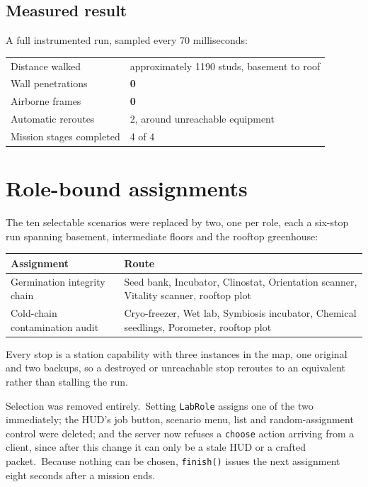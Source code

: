 \subsection{Measured result}
A full instrumented run, sampled every 70 milliseconds:

\begin{center}
\begin{tabular}{@{}ll@{}}
\toprule
Distance walked & approximately 1190 studs, basement to roof \\
Wall penetrations & \textbf{0} \\
Airborne frames & \textbf{0} \\
Automatic reroutes & 2, around unreachable equipment \\
Mission stages completed & 4 of 4 \\
\bottomrule
\end{tabular}
\end{center}

\section{Role-bound assignments}
The ten selectable scenarios were replaced by two, one per role, each a
six-stop run spanning basement, intermediate floors and the rooftop greenhouse:

\begin{center}
\begin{tabular}{@{}p{}p{}@{}}
\toprule
\textbf{Assignment} & \textbf{Route} \\
\midrule
Germination integrity chain & Seed bank, Incubator, Clinostat, Orientation scanner, Vitality scanner, rooftop plot \\
Cold-chain contamination audit & Cryo-freezer, Wet lab, Symbiosis incubator, Chemical seedlings, Porometer, rooftop plot \\
\bottomrule
\end{tabular}
\end{center}

Every stop is a station capability with three instances in the map, one original
and two backups, so a destroyed or unreachable stop reroutes to an equivalent
rather than stalling the run.\

Selection was removed entirely.\ Setting \texttt{LabRole} assigns one of the two
immediately; the HUD's job button, scenario menu, list and random-assignment
control were deleted; and the server now refuses a \texttt{choose} action
arriving from a client, since after this change it can only be a stale HUD or a
crafted packet.\ Because nothing can be chosen, \texttt{finish()} issues the
next assignment eight seconds after a mission ends.\

